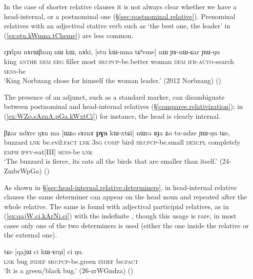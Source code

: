 In the case of shorter relative clauses it is not always clear whether we have a head-internal, or a postnominal one (§\ref{sec:postnominal.relative}). Prenominal relatives with an adjectival stative verb such as  `the best one, the leader' in (\ref{ex:stu.kWmna.tCheme}) are less common.


\begin{exe}
\ex \label{ex:stu.kWmna.tCheme}
\gll  rɟɤlpu nɤrɯβzaŋ nɯ kɯ, nɤki, [stu kɯ-mna tɕʰeme] nɯ ɲɤ-nɯ-ɕar ɲɯ-ŋu \\
king  \textsc{anthr} \textsc{dem} \textsc{erg} filler most \textsc{sbj}:\textsc{pcp}-be.better woman \textsc{dem} \textsc{ifr}-\textsc{auto}-search \textsc{sens}-be \\
\glt `King Norbzang chose for himself the woman leader.' (2012 Norbzang)
()
\end{exe} 


The presence of an adjunct, such as a standard marker, can disambiguate between postnominal and head-internal relatives (§\ref{comparee.relativization}); in (\ref{ex:WZo.sAznA.pGa.kWxtCi}) for instance, the head  is clearly internal.

\begin{exe}
\ex \label{ex:WZo.sAznA.pGa.kWxtCi}
\gll βʑar ndɤre ŋɤn ma [ɯʑo sɤznɤ \textbf{pɣa} kɯ-xtɕi] nɯra ʁɟa ʑo tu-ndze ɲɯ-ŋu tɕe, \\
buzzard \textsc{lnk} be.evil:\textsc{fact} \textsc{lnk} \textsc{3sg} \textsc{comp} bird \textsc{sbj}:\textsc{pcp}-be.small \textsc{dem}:\textsc{pl} completely \textsc{emph}  \textsc{ipfv}-eat[III] \textsc{sens}-be \textsc{lnk} \\
\glt `The buzzard is fierce, its eats all the birds that are smaller than itself.' (24-ZmbrWpGa)
()
\end{exe}

As shown in §\ref{sec:head-internal.relative.determiners}, in head-internal relative clauses the same determiner can appear on the head noun and repeated after the whole relative. The same is found with adjectival participial relatives, as in (\ref{ex:qajW.ci.kArNi.ci}) with the indefinite , though this usage is rare, in most cases only one of the two determiners is used (either the one inside the relative or the external one).

\begin{exe}
\ex \label{ex:qajW.ci.kArNi.ci}
\gll tɕe [qajɯ ci kɯ-ɤrŋi] ci ŋu. \\
\textsc{lnk} bug \textsc{indef} \textsc{sbj}:\textsc{pcp}-be.green \textsc{indef} be:\textsc{fact} \\
\glt `It is a green/black bug.' (26-zrWGndza)
()
\end{exe}

